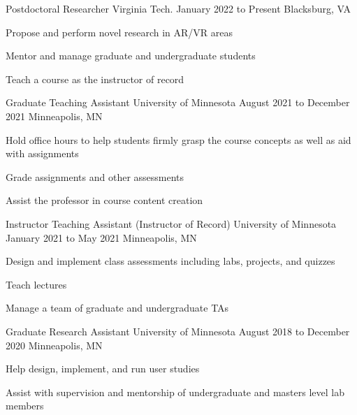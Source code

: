 
\begin{cventries}
  \cventry
    {Postdoctoral Researcher} %
    {Virginia Tech.} %
    {January 2022 to Present} %
    {Blacksburg, VA} %
    {
      \begin{cvitems} %
        \item {Propose and perform novel research in AR/VR areas}
        \item {Mentor and manage graduate and undergraduate students}
		\item {Teach a course as the instructor of record}
      \end{cvitems}
    }
    
  \cventry
    {Graduate Teaching Assistant} %
    {University of Minnesota} %
    {August 2021 to December 2021} %
    {Minneapolis, MN} %
    {
      \begin{cvitems} %
        \item {Hold office hours to help students firmly grasp the course concepts as well as aid with assignments}
        \item {Grade assignments and other assessments}
		\item {Assist the professor in course content creation}
      \end{cvitems}
    }
    
  \cventry
    {Instructor Teaching Assistant (Instructor of Record)} %
    {University of Minnesota} %
    {January 2021 to May 2021} %
    {Minneapolis, MN} %
    {
      \begin{cvitems} %
        \item {Design and implement class assessments including labs, projects, and quizzes}
        \item {Teach lectures}
		\item {Manage a team of graduate and undergraduate TAs}
      \end{cvitems}
    }
    
  \cventry
    {Graduate Research Assistant} %
    {University of Minnesota} %
    {August 2018 to December 2020} %
    {Minneapolis, MN} %
    {
      \begin{cvitems} %
        \item {Help design, implement, and run user studies}
		\item {Assist with supervision and mentorship of undergraduate and masters level lab members}
      \end{cvitems}
    }
    

\end{cventries}
